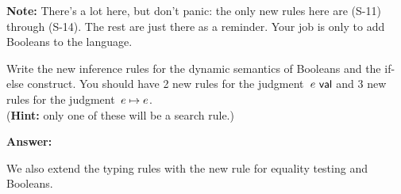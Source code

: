 \documentclass{article}
\begin{document}
\textbf{Note:} There's a lot here, but don't panic:
the only new rules here are (S-11) through (S-14). The rest are just there
as a reminder. Your job is only to add Booleans to the language.

{
  \centering
  \def \MathparLineskip {\lineskip=0.43cm}
}

\begin{task}\label{task:dyn}
  Write the new inference rules for the dynamic semantics of Booleans and the
  if-else construct.
  You should have 2 new rules for the judgment~$e~\mathsf{val}$ and 3 new rules
  for the judgment~$e \mapsto e$.\\
  (\textbf{Hint:} only one of these will be a search rule.)
\end{task}

\textbf{Answer:}

We also extend the typing rules with the new rule for equality testing and
Booleans.
\end{document}
